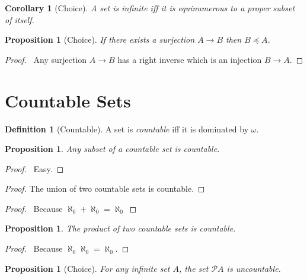 \documentclass{article}
\let\qed\relax
\newtheorem{proposition}[axiom]{Proposition}
\newtheorem{corollary}{Corollary}[axiom]
\theoremstyle{definition}
\newtheorem{definition}[axiom]{Definition}
\begin{document}
    \begin{corollary}[Choice]
        A set is infinite iff it is equinumerous to a proper subset of itself.
    \end{corollary}
    
    \begin{proposition}[Choice]
        If there exists a surjection $A \rightarrow B$ then $B \preccurlyeq A$.
    \end{proposition}

    \begin{proof}
        \pf\ Any surjection $A \rightarrow B$ has a right inverse which is an injection $B \rightarrow A$.
    \end{proof}
    \section{Countable Sets}

    \begin{definition}[Countable]
        A set is \emph{countable} iff it is dominated by $\omega$.
    \end{definition}

    \begin{proposition}
        Any subset of a countable set is countable.
    \end{proposition}

    \begin{proof}
        \pf\ Easy. \qed
    \end{proof}

    \begin{proof}
        The union of two countable sets is countable.
    \end{proof}

    \begin{proof}
        \pf\ Because $\aleph_0 + \aleph_0 = \aleph_0$ \qed
    \end{proof}

    \begin{proposition}
        The product of two countable sets is countable.
    \end{proposition}

    \begin{proof}
        \pf\ Because $\aleph_0 \aleph_0 = \aleph_0$. \qed
    \end{proof}

    \begin{proposition}[Choice]
        For any infinite set $A$, the set $\mathcal{P} A$ is uncountable.
    \end{proposition}
\end{document}
